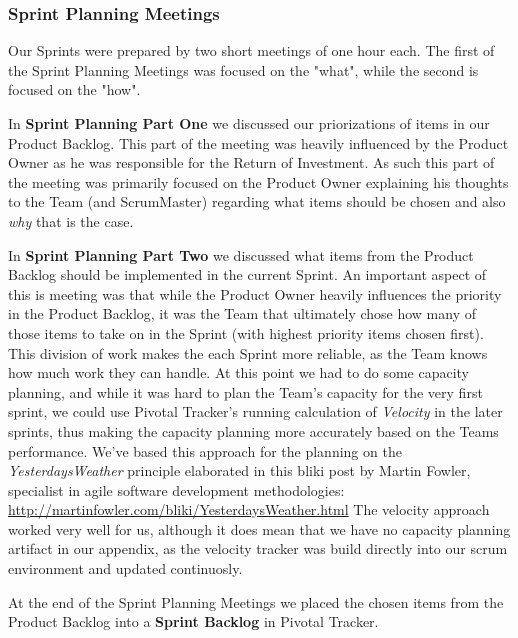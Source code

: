 \subsubsection{Sprint Planning Meetings} 
Our Sprints were prepared by two short meetings of one hour each. The first of the Sprint Planning Meetings was focused on the "what", while the second is focused on the "how".

In \textbf{Sprint Planning Part One}  we discussed our priorizations of items in our Product Backlog. This part of the meeting was heavily influenced by the Product Owner as he was responsible for the Return of Investment. As such this part of the meeting was primarily focused on the Product Owner explaining his thoughts to the Team (and ScrumMaster) regarding what items should be chosen and also \textit{why} that is the case.

In \textbf{Sprint Planning Part Two} we discussed what items from the Product Backlog should be implemented in the current Sprint. An important aspect of this is meeting was that while the Product Owner heavily influences the priority in the Product Backlog, it was the Team that ultimately chose how many of those items to take on in the Sprint (with highest priority items chosen first). This division of work makes the each Sprint more reliable, as the Team knows how much work they can handle. At this point we had to do some capacity planning, and while it was hard to plan the Team's capacity for the very first sprint, we could use Pivotal Tracker's running calculation of \textit{Velocity} in the later sprints, thus making the capacity planning more accurately based on the Teams performance. We've based this approach for the planning on the \textit{YesterdaysWeather} principle elaborated in this bliki post by Martin Fowler, specialist in agile software development methodologies: \url{http://martinfowler.com/bliki/YesterdaysWeather.html}
The velocity approach worked very well for us, although it does mean that we have no capacity planning artifact in our appendix, as the velocity tracker was build directly into our scrum environment and updated continuosly.

 At the end of the Sprint Planning Meetings we placed the chosen items from the Product Backlog into a \textbf{Sprint Backlog} in Pivotal Tracker.
